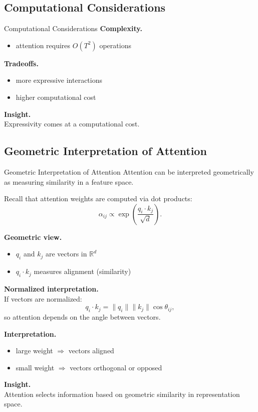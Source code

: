 \documentclass[aspectratio=169,11pt]{beamer}
\begin{document}
\subsection{Computational Considerations}
\begin{frame}[t,allowframebreaks]{Computational Considerations}
\small
\textbf{Complexity.}\\ \begin{itemize}
    \item attention requires $O(T^2)$ operations
\end{itemize}

\textbf{Tradeoffs.}\\ \begin{itemize}
    \item more expressive interactions
    \item higher computational cost
\end{itemize}

\textbf{Insight.}\\ Expressivity comes at a computational cost.
\end{frame}

\subsection{Geometric Interpretation of Attention}
\begin{frame}[t,allowframebreaks]{Geometric Interpretation of Attention}
\small
Attention can be interpreted geometrically as measuring similarity in a feature space.

Recall that attention weights are computed via dot products:
\[
\alpha_{ij} \propto \exp\left( \frac{q_i \cdot k_j}{\sqrt{d}} \right).
\]

\textbf{Geometric view.}\\ \begin{itemize}
    \item $q_i$ and $k_j$ are vectors in $\mathbb{R}^d$
    \item $q_i \cdot k_j$ measures alignment (similarity)
\end{itemize}

\textbf{Normalized interpretation.}\\ If vectors are normalized:
\[
q_i \cdot k_j = \|q_i\|\|k_j\|\cos\theta_{ij},
\]
so attention depends on the angle between vectors.

\textbf{Interpretation.}\\ \begin{itemize}
    \item large weight $\Rightarrow$ vectors aligned
    \item small weight $\Rightarrow$ vectors orthogonal or opposed
\end{itemize}

\textbf{Insight.}\\ Attention selects information based on geometric similarity in representation space.
\end{frame}
\end{document}
